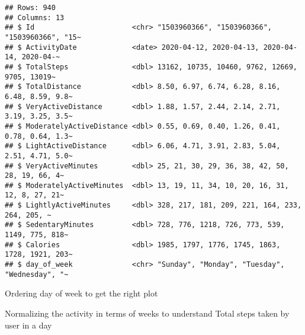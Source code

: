 \documentclass[
]{article}
\newenvironment{Shaded}{\begin{snugshade}}{\end{snugshade}}
\newcommand{\AttributeTok}[1]{\textcolor[rgb]{0.77,0.63,0.00}{#1}}
\newcommand{\ConstantTok}[1]{\textcolor[rgb]{0.00,0.00,0.00}{#1}}
\newcommand{\DecValTok}[1]{\textcolor[rgb]{0.00,0.00,0.81}{#1}}
\newcommand{\FunctionTok}[1]{\textcolor[rgb]{0.00,0.00,0.00}{#1}}
\newcommand{\NormalTok}[1]{#1}
\newcommand{\OtherTok}[1]{\textcolor[rgb]{0.56,0.35,0.01}{#1}}
\newcommand{\SpecialCharTok}[1]{\textcolor[rgb]{0.00,0.00,0.00}{#1}}
\newcommand{\StringTok}[1]{\textcolor[rgb]{0.31,0.60,0.02}{#1}}
\begin{document}
\begin{verbatim}
## Rows: 940
## Columns: 13
## $ Id                       <chr> "1503960366", "1503960366", "1503960366", "15~
## $ ActivityDate             <date> 2020-04-12, 2020-04-13, 2020-04-14, 2020-04-~
## $ TotalSteps               <dbl> 13162, 10735, 10460, 9762, 12669, 9705, 13019~
## $ TotalDistance            <dbl> 8.50, 6.97, 6.74, 6.28, 8.16, 6.48, 8.59, 9.8~
## $ VeryActiveDistance       <dbl> 1.88, 1.57, 2.44, 2.14, 2.71, 3.19, 3.25, 3.5~
## $ ModeratelyActiveDistance <dbl> 0.55, 0.69, 0.40, 1.26, 0.41, 0.78, 0.64, 1.3~
## $ LightActiveDistance      <dbl> 6.06, 4.71, 3.91, 2.83, 5.04, 2.51, 4.71, 5.0~
## $ VeryActiveMinutes        <dbl> 25, 21, 30, 29, 36, 38, 42, 50, 28, 19, 66, 4~
## $ ModeratelyActiveMinutes  <dbl> 13, 19, 11, 34, 10, 20, 16, 31, 12, 8, 27, 21~
## $ LightlyActiveMinutes     <dbl> 328, 217, 181, 209, 221, 164, 233, 264, 205, ~
## $ SedentaryMinutes         <dbl> 728, 776, 1218, 726, 773, 539, 1149, 775, 818~
## $ Calories                 <dbl> 1985, 1797, 1776, 1745, 1863, 1728, 1921, 203~
## $ day_of_week              <chr> "Sunday", "Monday", "Tuesday", "Wednesday", "~
\end{verbatim}

Ordering day of week to get the right plot

\begin{Shaded}
\end{Shaded}

Normalizing the activity in terms of weeks to understand Total steps
taken by user in a day

\begin{Shaded}
\end{Shaded}
\end{document}
